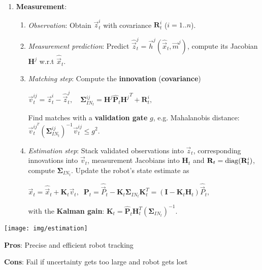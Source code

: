\documentclass[fontsize=6pt]{scrartcl}
\newcommand{\mat}[1]{\mathbf{#1}}
\begin{document}
\begin{multicols*}{4}
\begin{enumerate}
	\item \textbf{Measurement}:

\begin{enumerate}
	\item \textit{Observation}: Obtain $\vec z_t^i$ with
	covariance $\mat R_t^i$ ($i=1..n$).
	\item \textit{Measurement prediction}: Predict $\hat{\vec{z}}_t^j = \vec{h}^j(\hat{\vec{x}}_t, \vec{m}^j)$,
	compute its Jacobian $\mat{H}^j$ w.r.t $\hat{\vec{x}}_t$.
	\item \textit{Matching step}: Compute the \textbf{innovation}
	(\textbf{covariance})
	
	\begin{center}
		$
		\vec{v}_t^{ij}=\vec{z}_t^i - \hat{\vec{z}}_t^j,\quad
		\mat{\Sigma}_{IN_t}^{ij} = \mat{H}^j \hat{\mat{P}}_t {\mat{H}^j}^T + \mat{R}_t^i,$
	\end{center}
	
	Find matches with a \textbf{validation gate} $g$, e.g. Mahalanobis distance:
	$\vec{v}_{t}^{{ij}^T} (\mat{\Sigma}_{IN_t}^{ij})^{-1} \vec{v}_t^{ij} \le g^2$.
	
	\item \textit{Estimation step}: Stack validated observations into $\vec{z}_t$, corresponding
	innovations into $\vec v_t$, measurement Jacobians into $\mat H_t$ and
	$\mat R_t = \diag(\mat R_t^i)$, compute $\mat \Sigma_{IN_t}$. Update the robot's
	state estimate as
	
	\begin{center}
		$
		\vec x_t = \hat{\vec x}_t + \mat K_t \vec v_t,\;\;
		\mat P_t = \hat{\vec P}_t - \mat K_t \mat{\Sigma}_{IN_t}\mat{K}_t^T = (\mat I - \mat K_t \mat H_t)\hat{\vec P}_t,
		$
	\end{center}
	
	with the \textbf{Kalman gain}: $
		\mat K_t = \hat{\mat{P}}_t \mat{H}_t^T (\mat{ \Sigma}_{IN_t})^{-1}.
		$
\end{enumerate}
\end{enumerate}

\begin{minipage}{0.75\linewidth}
	\texttt{[image: img/estimation]}
\end{minipage}
\begin{minipage}{0.24\linewidth}
		\textbf{Pros}: Precise and efficient robot tracking
		
		\textbf{Cons}: Fail if uncertainty gets too large and robot gets lost
\end{minipage}



\end{multicols*}
\end{document}
